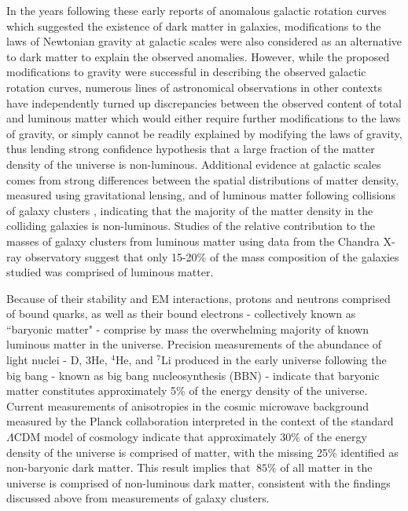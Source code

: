In the years following these early reports of anomalous galactic rotation curves which suggested the existence of dark matter in galaxies, modifications to the laws of Newtonian gravity at galactic scales \cite{mond_1983} were also considered as an alternative to dark matter to explain the observed anomalies. However, while the proposed modifications to gravity were successful in describing the observed galactic rotation curves, numerous lines of astronomical observations in other contexts have independently turned up discrepancies between the observed content of total and luminous matter which would either require further modifications to the laws of gravity, or simply cannot be readily explained by modifying the laws of gravity, thus lending strong confidence hypothesis that a large fraction of the matter density of the universe is non-luminous. Additional evidence at galactic scales comes from strong differences between the spatial distributions of matter density, measured using gravitational lensing, and of luminous matter following collisions of galaxy clusters \cite{bullet_1995}, indicating that the majority of the matter density in the colliding galaxies is non-luminous. Studies of the relative contribution to the masses of galaxy clusters from luminous matter using data from the Chandra X-ray observatory \cite{Chandra_2013} suggest that only 15-20\% of the mass composition of the galaxies studied was comprised of luminous matter.

Because of their stability and EM interactions, protons and neutrons comprised of bound quarks, as well as their bound electrons - collectively known as ``baryonic matter" - comprise by mass the overwhelming majority of known luminous matter in the universe. Precision measurements of the abundance of light nuclei - D, 3He, \(^4\)He, and \(^7\)Li  produced in the early universe following the big bang - known as big bang nucleosynthesis (BBN) \cite{pdg_2018} - indicate that baryonic matter constitutes approximately 5\% \cite{pdg_2018} of the energy density of the universe. Current measurements of anisotropies in the cosmic microwave background \cite{cmb_1965} measured by the Planck collaboration \cite{Planck_2020} interpreted in the context of the standard \(\Lambda\)CDM model of cosmology \cite{pdg_2018} indicate that approximately 30\% of the energy density of the universe is comprised of matter, with the missing 25\% identified as non-baryonic dark matter. This result implies that \(~85\%\) of all matter in the universe is comprised of non-luminous dark matter, consistent with the findings discussed above from measurements of galaxy clusters.

